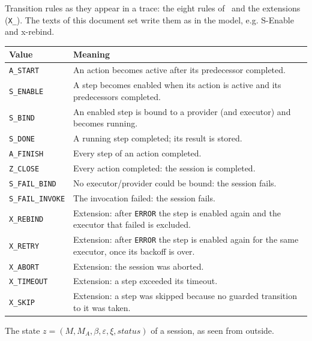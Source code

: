 \documentclass[a4paper]{arrowhead}
\begin{document}
Transition rules as they appear in a trace: the eight rules of~\cite{varga2026} and the extensions (\texttt{X\_}). The texts of this document set write them as in the model, e.g. S-Enable and x-rebind.

{\small
\begin{longtable}{|p{3.9cm}|p{11.9cm}|}

\hline
\rowcolor{gray!33} Value & Meaning \\ \hline
\endhead
\texttt{A\_START} & An action becomes active after its predecessor completed. \\ \hline
\texttt{S\_ENABLE} & A step becomes enabled when its action is active and its predecessors completed. \\ \hline
\texttt{S\_BIND} & An enabled step is bound to a provider (and executor) and becomes running. \\ \hline
\texttt{S\_DONE} & A running step completed; its result is stored. \\ \hline
\texttt{A\_FINISH} & Every step of an action completed. \\ \hline
\texttt{Z\_CLOSE} & Every action completed: the session is completed. \\ \hline
\texttt{S\_FAIL\_BIND} & No executor/provider could be bound: the session fails. \\ \hline
\texttt{S\_\allowbreak{}FAIL\_\allowbreak{}INVOKE} & The invocation failed: the session fails. \\ \hline
\texttt{X\_REBIND} & Extension: after \texttt{ERROR} the step is enabled again and the executor that failed is excluded. \\ \hline
\texttt{X\_RETRY} & Extension: after \texttt{ERROR} the step is enabled again for the same executor, once its backoff is over. \\ \hline
\texttt{X\_ABORT} & Extension: the session was aborted. \\ \hline
\texttt{X\_TIMEOUT} & Extension: a step exceeded its timeout. \\ \hline
\texttt{X\_SKIP} & Extension: a step was skipped because no guarded transition to it was taken. \\ \hline
\end{longtable}
}

The state $z = (M, M_A, \beta, \varepsilon, \xi, status)$ of a session, as seen from outside.
\end{document}
